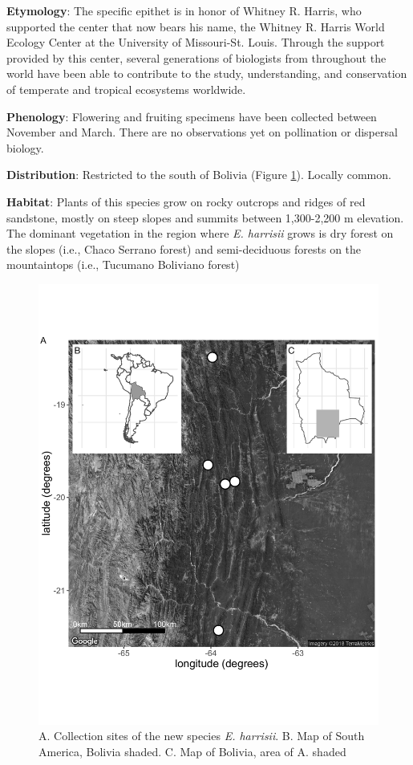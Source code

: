 \documentclass[fleqn,10pt,lineno]{wlpeerj} %
\begin{document}
\textbf{Etymology}: The specific epithet is in honor of Whitney R. Harris, who supported the center that now bears his name, the Whitney R. Harris World Ecology Center at the University of Missouri-St. Louis. Through the support provided by this center, several generations of biologists from throughout the world have been able to contribute to the study, understanding, and conservation of temperate and tropical ecosystems worldwide.

\textbf{Phenology}: Flowering and fruiting specimens have been collected between November and March. There are no observations yet on pollination or dispersal biology.

\textbf{Distribution}: Restricted to the south of Bolivia (Figure \ref{fig:Figure7}). Locally common.

\textbf{Habitat}: Plants of this species grow on rocky outcrops and ridges of red sandstone, mostly on steep slopes and summits between 1,300-2,200 m elevation. The dominant vegetation in the region where \emph{E. harrisii} grows is dry forest on the slopes (i.e., Chaco Serrano forest) and semi-deciduous forests on the mountaintops (i.e., Tucumano Boliviano forest) 

\begin{figure}[ht]
\centering
\includegraphics[width=\linewidth]{Figure7}
\caption{A. Collection sites of the new species \emph{E. harrisii}. B. Map of South America, Bolivia shaded. C. Map of Bolivia, area of A. shaded}
\label{fig:Figure7}
\end{figure}
\end{document}
